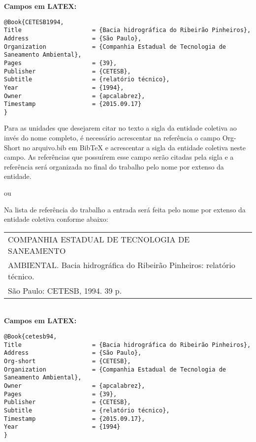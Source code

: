\textbf{Campos em LATEX:}

\begin{verbatim}
@Book{CETESB1994,
Title                    = {Bacia hidrográfica do Ribeirão Pinheiros},
Address                  = {São Paulo},
Organization             = {Companhia Estadual de Tecnologia de 
Saneamento Ambiental},
Pages                    = {39},
Publisher                = {CETESB},
Subtitle                 = {relatório técnico},
Year                     = {1994},
Owner                    = {apcalabrez},
Timestamp                = {2015.09.17}
}
\end{verbatim}

Para as unidades que desejarem citar no texto a sigla da entidade coletiva ao invés do nome completo, é necessário acrescentar na referência o campo Org-Short no arquivo.bib em BibTeX e acrescentar a sigla da entidade coletiva neste campo. As referências que possuírem esse campo serão citadas pela sigla e a referência será organizada no final do trabalho pelo nome por extenso da entidade.

\cite{cetesb94}

ou 


Na lista de referência do trabalho a entrada será feita pelo nome por extenso da entidade coletiva conforme abaixo:

\begin{tabular}{|l|c|} \hline
COMPANHIA ESTADUAL DE TECNOLOGIA DE SANEAMENTO \\AMBIENTAL.
Bacia hidrográfica do Ribeirão Pinheiros: relatório técnico.\\ São Paulo: CETESB,
1994. 39 p. \\\hline 
\end{tabular}\\

\textbf{Campos em LATEX:}

\begin{verbatim}
@Book{cetesb94,
Title                    = {Bacia hidrográfica do Ribeirão Pinheiros},
Address                  = {São Paulo},
Org-short                = {CETESB},
Organization             = {Companhia Estadual de Tecnologia de 
Saneamento Ambiental},
Owner                    = {apcalabrez},
Pages                    = {39},
Publisher                = {CETESB},
Subtitle                 = {relatório técnico},
Timestamp                = {2015.09.17},
Year                     = {1994}
}
\end{verbatim}


